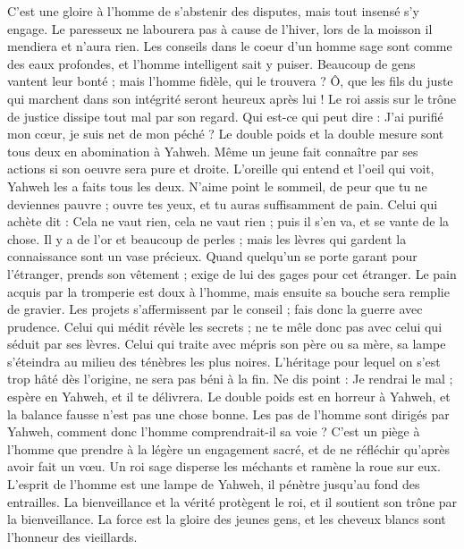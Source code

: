 \begin{multicols}{2}
C'est une gloire à l'homme de s'abstenir des disputes, mais tout insensé s'y engage.
Le paresseux ne labourera pas à cause de l’hiver, lors de la moisson il mendiera et n'aura rien.
Les conseils dans le coeur d'un homme sage sont comme des eaux profondes, et l'homme intelligent sait y puiser.
Beaucoup de gens vantent leur bonté ; mais l’homme fidèle, qui le trouvera ?
Ô, que les fils du juste qui marchent dans son intégrité seront heureux après lui !
Le roi assis sur le trône de justice dissipe tout mal par son regard.
Qui est-ce qui peut dire : J'ai purifié mon cœur, je suis net de mon péché ?
Le double poids et la double mesure sont tous deux en abomination à Yahweh.
Même un jeune fait connaître par ses actions si son oeuvre sera pure et droite.
L'oreille qui entend et l'oeil qui voit, Yahweh les a faits tous les deux.
N'aime point le sommeil, de peur que tu ne deviennes pauvre ; ouvre tes yeux, et tu auras suffisamment de pain.
Celui qui achète dit : Cela ne vaut rien, cela ne vaut rien ; puis il s'en va, et se vante de la chose.
Il y a de l'or et beaucoup de perles ; mais les lèvres qui gardent la connaissance sont un vase précieux.
Quand quelqu'un se porte garant pour l'étranger, prends son vêtement ;  exige de lui des gages pour cet étranger.
Le pain acquis par la tromperie est doux à l'homme, mais ensuite sa bouche sera remplie de gravier.
Les projets s'affermissent par le conseil ; fais donc la guerre avec prudence.
Celui qui médit révèle les secrets ; ne te mêle donc pas avec celui qui séduit par ses lèvres.
Celui qui traite avec mépris son père ou sa mère, sa lampe s’éteindra au milieu des ténèbres les plus noires.
L'héritage pour lequel on s'est trop hâté dès l’origine, ne sera pas béni à la fin.
Ne dis point : Je rendrai le mal ; espère en Yahweh, et il te délivrera.
Le double poids est en horreur à Yahweh, et la balance fausse n'est pas une chose bonne.
Les pas de l'homme sont dirigés par Yahweh, comment donc l'homme comprendrait-il sa voie ?
C'est un piège à l'homme que prendre à la légère un engagement sacré, et de ne réfléchir qu’après avoir fait un vœu.
Un roi sage disperse les méchants et ramène la roue sur eux.
L'esprit de l'homme est une lampe de Yahweh, il pénètre jusqu’au fond des entrailles.
La bienveillance et la vérité protègent le roi, et il soutient son trône par la bienveillance.
La force est la gloire des jeunes gens, et les cheveux blancs sont l'honneur des vieillards.

\end{multicols}
